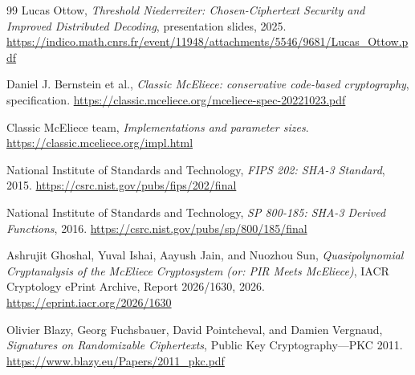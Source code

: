 \documentclass[11pt]{article}
\begin{document}
\begin{thebibliography}{99}
Lucas Ottow,
\emph{Threshold Niederreiter: Chosen-Ciphertext Security and Improved
Distributed Decoding}, presentation slides, 2025.
\url{https://indico.math.cnrs.fr/event/11948/attachments/5546/9681/Lucas_Ottow.pdf}

Daniel J. Bernstein et al.,
\emph{Classic McEliece: conservative code-based cryptography}, specification.
\url{https://classic.mceliece.org/mceliece-spec-20221023.pdf}

Classic McEliece team,
\emph{Implementations and parameter sizes}.
\url{https://classic.mceliece.org/impl.html}

National Institute of Standards and Technology,
\emph{FIPS 202: SHA-3 Standard}, 2015.
\url{https://csrc.nist.gov/pubs/fips/202/final}

National Institute of Standards and Technology,
\emph{SP 800-185: SHA-3 Derived Functions}, 2016.
\url{https://csrc.nist.gov/pubs/sp/800/185/final}

Ashrujit Ghoshal, Yuval Ishai, Aayush Jain, and Nuozhou Sun,
\emph{Quasipolynomial Cryptanalysis of the McEliece Cryptosystem
(or: PIR Meets McEliece)}, IACR Cryptology ePrint Archive,
Report 2026/1630, 2026.
\url{https://eprint.iacr.org/2026/1630}

Olivier Blazy, Georg Fuchsbauer, David Pointcheval, and Damien Vergnaud,
\emph{Signatures on Randomizable Ciphertexts},
Public Key Cryptography---PKC 2011.
\url{https://www.blazy.eu/Papers/2011_pkc.pdf}

\end{thebibliography}
\end{document}
